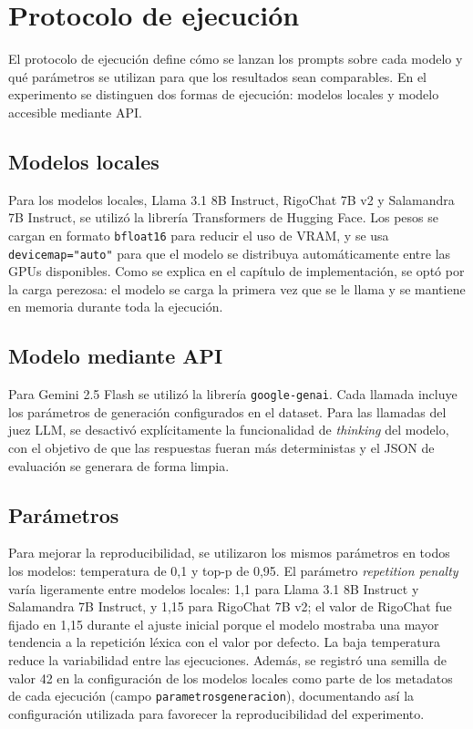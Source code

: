 \documentclass[12pt]{report} %
\renewcommand{\_}{\oldunderscore\allowbreak}
\begin{document}
\section{Protocolo de ejecución}

El protocolo de ejecución define cómo se lanzan los prompts sobre cada modelo y qué parámetros se utilizan para que los resultados sean comparables. En el experimento se distinguen dos formas de ejecución: modelos locales y modelo accesible mediante API.

\subsection{Modelos locales}

Para los modelos locales, Llama 3.1 8B Instruct, RigoChat 7B v2 y Salamandra 7B Instruct, se utilizó la librería Transformers de Hugging Face. Los pesos se cargan en formato \texttt{bfloat16} para reducir el uso de VRAM, y se usa \texttt{device\_map="auto"} para que el modelo se distribuya automáticamente entre las GPUs disponibles. Como se explica en el capítulo de implementación, se optó por la carga perezosa: el modelo se carga la primera vez que se le llama y se mantiene en memoria durante toda la ejecución.

\subsection{Modelo mediante API}

Para Gemini 2.5 Flash se utilizó la librería \texttt{google-genai}. Cada llamada incluye los parámetros de generación configurados en el dataset. Para las llamadas del juez LLM, se desactivó explícitamente la funcionalidad de \textit{thinking} del modelo, con el objetivo de que las respuestas fueran más deterministas y el JSON de evaluación se generara de forma limpia.

\subsection{Parámetros}

Para mejorar la reproducibilidad, se utilizaron los mismos parámetros en todos los modelos: temperatura de 0,1 y top-p de 0,95. El parámetro \textit{repetition penalty} varía ligeramente entre modelos locales: 1,1 para Llama 3.1 8B Instruct y Salamandra 7B Instruct, y 1,15 para RigoChat 7B v2; el valor de RigoChat fue fijado en 1,15 durante el ajuste inicial porque el modelo mostraba una mayor tendencia a la repetición léxica con el valor por defecto. La baja temperatura reduce la variabilidad entre las ejecuciones. Además, se registró una semilla de valor 42 en la configuración de los modelos locales como parte de los metadatos de cada ejecución (campo \texttt{parametros\_generacion}), documentando así la configuración utilizada para favorecer la reproducibilidad del experimento.
\end{document}
